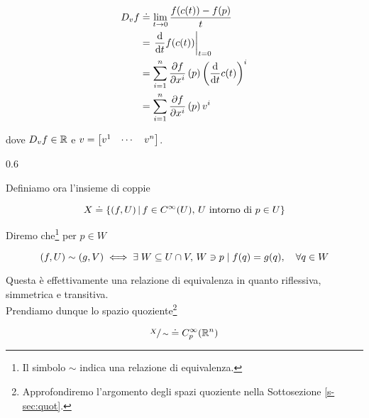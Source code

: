 \begin{align}
	\begin{split}
		D_{v} f &\doteq \lim_{t \to 0} \dfrac{f(c(t)) - f(p)}{t} \\
		&= \left. \dv{t} f(c(t)) \right|_{t=0} \\
		&= \sum_{i=1}^{n} \pdv{f}{x^{i}} \, (p) \left( \dv{t} c(t) \right)^{i} \\
		&= \sum_{i=1}^{n} \pdv{f}{x^{i}} \, (p) \, v^{i}
	\end{split}
\end{align}

dove $ D_{v} f \in \mathbb{R} $ e $ v = \bmqty{ v^{1} & \cdots & v^{n} } $.

	{0.6}{%
			}

Definiamo ora l'insieme di coppie

\begin{equation}
	X \doteq \left\{ (f,U) \, \middle| \, f \in C^{\infty}(U), \, U \text{ intorno di } p \in U \right\}
\end{equation}

Diremo che\footnote{%
	Il simbolo $ \sim $ indica una relazione di equivalenza.%
} per $ p \in W $

\begin{equation}
	(f,U) \sim (g,V) \iff \E W \subseteq U \cap V, \, W \ni p \mid f(q) = g(q) \qcomma \forall q \in W
\end{equation}

Questa è effettivamente una relazione di equivalenza in quanto riflessiva, simmetrica e transitiva. \\
Prendiamo dunque lo spazio quoziente\footnote{%
	Approfondiremo l'argomento degli spazi quoziente nella Sottosezione \ref{s-sec:quot}.%
}

\begin{equation}
	\sfrac{X}{\sim} \doteq C_{p}^{\infty}(\mathbb{R}^{n})
\end{equation}

